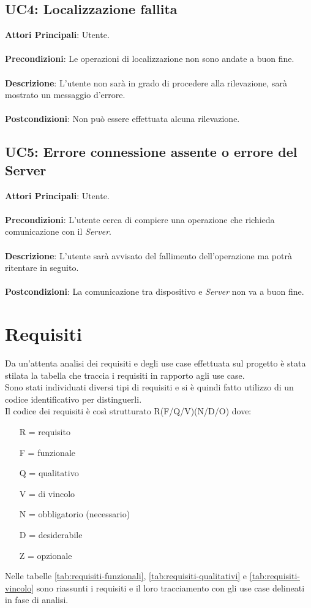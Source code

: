 \subsection{UC4: Localizzazione fallita}
\textbf{Attori Principali}: Utente.
\\\\ \textbf{Precondizioni}: Le operazioni di localizzazione non sono andate a buon fine.
\\\\ \textbf{Descrizione}: L'utente non sarà in grado di procedere alla rilevazione, sarà mostrato un messaggio d'errore.
\\\\ \textbf{Postcondizioni}: Non può essere effettuata alcuna rilevazione.


\subsection{UC5: Errore connessione assente o errore del Server}
\textbf{Attori Principali}: Utente.
\\\\ \textbf{Precondizioni}: L'utente cerca di compiere una operazione che richieda comunicazione con il \emph{Server}.
\\\\ \textbf{Descrizione}: L'utente sarà avvisato del fallimento dell'operazione ma potrà ritentare in seguito.
\\\\ \textbf{Postcondizioni}: La comunicazione tra dispositivo e \emph{Server} non va a buon fine.



\section{Requisiti}

Da un'attenta analisi dei requisiti e degli use case effettuata sul progetto è stata stilata la tabella che traccia i requisiti in rapporto agli use case.\\
Sono stati individuati diversi tipi di requisiti e si è quindi fatto utilizzo di un codice identificativo per distinguerli.\\
Il codice dei requisiti è così strutturato R(F/Q/V)(N/D/O) dove:
\begin{enumerate}
	\item[R =] requisito
    \item[F =] funzionale
    \item[Q =] qualitativo
    \item[V =] di vincolo
    \item[N =] obbligatorio (necessario)
    \item[D =] desiderabile
    \item[Z =] opzionale
\end{enumerate}
Nelle tabelle \ref{tab:requisiti-funzionali}, \ref{tab:requisiti-qualitativi} e \ref{tab:requisiti-vincolo} sono riassunti i requisiti e il loro tracciamento con gli use case delineati in fase di analisi.

